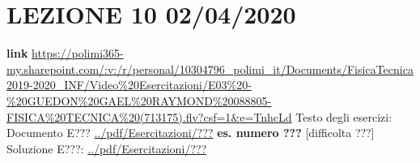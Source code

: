 \section*{LEZIONE 10 02/04/2020}
\textbf{link} \url{https://polimi365-my.sharepoint.com/:v:/r/personal/10304796_polimi_it/Documents/FisicaTecnica2019-2020_INF/Video%20Esercitazioni/E03%20-%20GUEDON%20GAEL%20RAYMOND%20088805-FISICA%20TECNICA%20(713175).flv?csf=1&e=TnhcLd}\newline
\newline
Testo degli esercizi:\newline
Documento E??? \url{../pdf/Esercitazioni/???}\newline
\textbf{es. numero ???} [difficolta ???]\newline
Soluzione E???: \url{../pdf/Esercitazioni/???}
